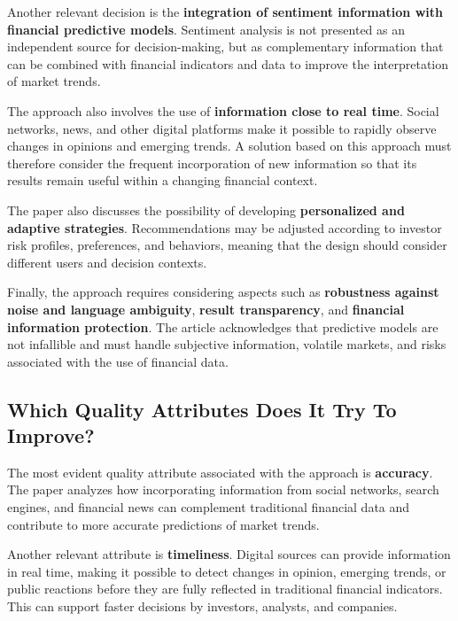 Another relevant decision is the \textbf{integration of sentiment information with financial predictive models}. Sentiment analysis is not presented as an independent source for decision-making, but as complementary information that can be combined with financial indicators and data to improve the interpretation of market trends.

\vspace{2mm}

The approach also involves the use of \textbf{information close to real time}. Social networks, news, and other digital platforms make it possible to rapidly observe changes in opinions and emerging trends. A solution based on this approach must therefore consider the frequent incorporation of new information so that its results remain useful within a changing financial context.

\vspace{2mm}

The paper also discusses the possibility of developing \textbf{personalized and adaptive strategies}. Recommendations may be adjusted according to investor risk profiles, preferences, and behaviors, meaning that the design should consider different users and decision contexts.

\vspace{2mm}

Finally, the approach requires considering aspects such as \textbf{robustness against noise and language ambiguity}, \textbf{result transparency}, and \textbf{financial information protection}. The article acknowledges that predictive models are not infallible and must handle subjective information, volatile markets, and risks associated with the use of financial data.


\subsection{Which Quality Attributes Does It Try To Improve?}
\vspace{2mm}

The most evident quality attribute associated with the approach is \textbf{accuracy}. The paper analyzes how incorporating information from social networks, search engines, and financial news can complement traditional financial data and contribute to more accurate predictions of market trends.

\vspace{2mm}

Another relevant attribute is \textbf{timeliness}. Digital sources can provide information in real time, making it possible to detect changes in opinion, emerging trends, or public reactions before they are fully reflected in traditional financial indicators. This can support faster decisions by investors, analysts, and companies.

